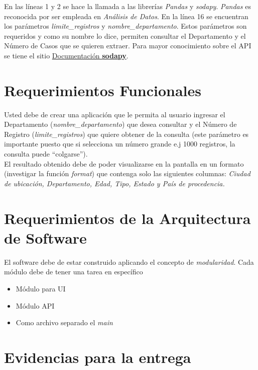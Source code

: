 \documentclass[12pt]{article}
\begin{document}
En las líneas 1 y 2 se hace la llamada a las librerías \textit{Pandas} y \textit{sodapy}. \textit{Pandas} es reconocida por ser empleada en \textit{Análisis de Datos}. En la línea 16 se encuentran los parámetros \textit{limite\_registros} y \textit{nombre\_departamento}. Estos parámetros son requeridos y como su nombre lo dice, permiten consultar el Departamento y el Número de Casos que se quieren extraer. Para mayor conocimiento sobre el API se tiene el sitio \href{https://github.com/xmunoz/sodapy}{Documentación \textbf{sodapy}}.

\section{Requerimientos Funcionales}
\label{requerimientos_funcionales}

Usted debe de crear una aplicación que le permita al usuario ingresar el Departamento (\textit{nombre\_departamento}) que desea consultar y el Número de Registro (\textit{limite\_registros}) que quiere obtener de la consulta (este parámetro es importante puesto que si selecciona un número grande e.j 1000 registros, la consulta puede ``colgarse'').\\

El resultado obtenido debe de poder visualizarse en la pantalla en un formato (investigar la función \textit{ format}) que contenga solo las siguientes columnas: \textit{Ciudad de ubicación, Departamento, Edad, Tipo, Estado y País de procedencia.}


\section{Requerimientos de la Arquitectura de Software}

El software debe de estar construido aplicando el concepto de \textit{modularidad}. Cada módulo debe de tener una tarea en específico 


\begin{itemize}
\item Módulo para UI
\item Módulo API
\item Como archivo separado el \textit{main}
\end{itemize}


\section{Evidencias para la entrega}
\end{document}
